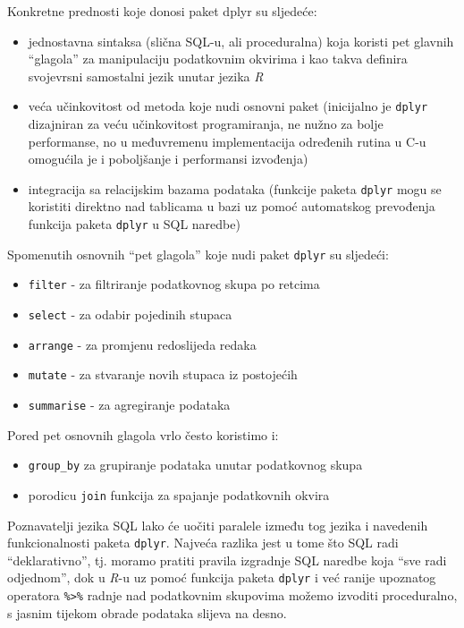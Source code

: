 \documentclass[]{book}
\providecommand{\tightlist}{%
  \setlength{\itemsep}{0pt}\setlength{\parskip}{0pt}}
\theoremstyle{definition}
\theoremstyle{definition}
\theoremstyle{definition}
\theoremstyle{remark}
\begin{document}
Konkretne prednosti koje donosi paket dplyr su sljedeće:

\begin{itemize}
\tightlist
\item
  jednostavna sintaksa (slična SQL-u, ali proceduralna) koja koristi pet
  glavnih ``glagola'' za manipulaciju podatkovnim okvirima i kao takva
  definira svojevrsni samostalni jezik unutar jezika \emph{R}
\item
  veća učinkovitost od metoda koje nudi osnovni paket (inicijalno je
  \texttt{dplyr} dizajniran za veću učinkovitost programiranja, ne nužno
  za bolje performanse, no u međuvremenu implementacija određenih rutina
  u C-u omogućila je i poboljšanje i performansi izvođenja)
\item
  integracija sa relacijskim bazama podataka (funkcije paketa
  \texttt{dplyr} mogu se koristiti direktno nad tablicama u bazi uz
  pomoć automatskog prevođenja funkcija paketa \texttt{dplyr} u SQL
  naredbe)
\end{itemize}

Spomenutih osnovnih ``pet glagola'' koje nudi paket \texttt{dplyr} su
sljedeći:

\begin{itemize}
\tightlist
\item
  \texttt{filter} - za filtriranje podatkovnog skupa po retcima
\item
  \texttt{select} - za odabir pojedinih stupaca
\item
  \texttt{arrange} - za promjenu redoslijeda redaka
\item
  \texttt{mutate} - za stvaranje novih stupaca iz postojećih
\item
  \texttt{summarise} - za agregiranje podataka
\end{itemize}

Pored pet osnovnih glagola vrlo često koristimo i:

\begin{itemize}
\tightlist
\item
  \texttt{group\_by} za grupiranje podataka unutar podatkovnog skupa
\item
  porodicu \texttt{join} funkcija za spajanje podatkovnih okvira
\end{itemize}

Poznavatelji jezika SQL lako će uočiti paralele između tog jezika i
navedenih funkcionalnosti paketa \texttt{dplyr}. Najveća razlika jest u
tome što SQL radi ``deklarativno'', tj. moramo pratiti pravila izgradnje
SQL naredbe koja ``sve radi odjednom'', dok u \emph{R}-u uz pomoć
funkcija paketa \texttt{dplyr} i već ranije upoznatog operatora
\texttt{\%\textgreater{}\%} radnje nad podatkovnim skupovima možemo
izvoditi proceduralno, s jasnim tijekom obrade podataka slijeva na
desno.
\end{document}
